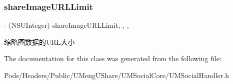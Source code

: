 \subsubsection{\texorpdfstring{share\+Image\+U\+R\+L\+Limit}{shareImageURLLimit}}
{\footnotesize\ttfamily -\/ (N\+S\+U\+Integer) share\+Image\+U\+R\+L\+Limit\hspace{0.3cm}{\ttfamily [read]}, {\ttfamily [write]}, {\ttfamily [nonatomic]}, {\ttfamily [assign]}}

缩略图数据的\+U\+R\+L大小 

The documentation for this class was generated from the following file\+:\begin{DoxyCompactItemize}
\item 
Pods/\+Headers/\+Public/\+U\+Meng\+U\+Share/\+U\+M\+Social\+Core/U\+M\+Social\+Handler.\+h\end{DoxyCompactItemize}
